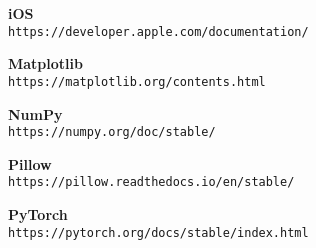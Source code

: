 \documentclass[../Report.tex]{subfiles}
\begin{document}
\begin{thebibliography}{9}
    \textbf{iOS}
    \\\texttt{https://developer.apple.com/documentation/}

    \textbf{Matplotlib}
    \\\texttt{https://matplotlib.org/contents.html}

    \textbf{NumPy}
    \\\texttt{https://numpy.org/doc/stable/}

    \textbf{Pillow}
    \\\texttt{https://pillow.readthedocs.io/en/stable/}

    \textbf{PyTorch}
    \\\texttt{https://pytorch.org/docs/stable/index.html}




\end{thebibliography}
\end{document}
